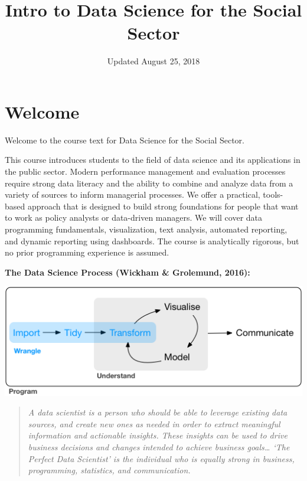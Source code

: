\documentclass[]{book}
\title{Intro to Data Science for the Social Sector}
\author{}
\date{Updated August 25, 2018}
\theoremstyle{definition}
\theoremstyle{definition}
\theoremstyle{definition}
\theoremstyle{remark}
\begin{document}
\maketitle

{
\setcounter{tocdepth}{1}
\tableofcontents
}
\hypertarget{welcome}{%
\chapter*{Welcome}\label{welcome}}

Welcome to the course text for Data Science for the Social Sector.

This course introduces students to the field of data science and its
applications in the public sector. Modern performance management and
evaluation processes require strong data literacy and the ability to
combine and analyze data from a variety of sources to inform managerial
processes. We offer a practical, tools-based approach that is designed
to build strong foundations for people that want to work as policy
analysts or data-driven managers. We will cover data programming
fundamentals, visualization, text analysis, automated reporting, and
dynamic reporting using dashboards. The course is analytically rigorous,
but no prior programming experience is assumed.

\textbf{The Data Science Process (Wickham \& Grolemund, 2016):}

\includegraphics{figures/data-science-wrangle.png}

\begin{quote}
\emph{A data scientist is a person who should be able to leverage
existing data sources, and create new ones as needed in order to extract
meaningful information and actionable insights. These insights can be
used to drive business decisions and changes intended to achieve
business goals\ldots{} `The Perfect Data Scientist' is the individual
who is equally strong in business, programming, statistics, and
communication.}
\end{quote}
\end{document}
